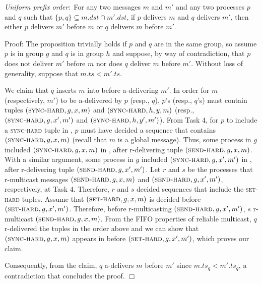 \begin{proposition}
\textit{Uniform prefix order}:~For any two messages $m$ and $m'$ and any two processes $p$ and $q$ such that $\lbrace p, q\rbrace \subseteq m.\mathit{dst} \cap m'.\mathit{dst}$, if $p$ delivers $m$ and $q$ delivers $m'$, then either $p$ delivers $m'$ before $m$ or $q$ delivers $m$ before $m'$.
\end{proposition}
\noindent
{\sc Proof:} 
The proposition trivially holds if $p$ and $q$ are in the same group, so assume $p$ is in group $g$ and $q$ is in group $h$ and suppose, by way of contradiction, that $p$ does not deliver $m'$ before $m$ nor does $q$ deliver $m$ before $m'$. 
Without loss of generality, suppose that $m.ts < m'.ts$. 

We claim that $q$ inserts $m$ into \Buffer before a-delivering $m'$. 
In order for $m$ (respectively, $m'$) to be a-delivered by $p$ (resp., $q$), $p$'s (resp., $q$'s) \Buffer must contain tuples $(\textsc{sync-hard}, g, x, m)$ and $(\textsc{sync-hard}, h, y, m)$ (resp., $(\textsc{sync-hard}, g, x', m')$ and $(\textsc{sync-hard}, h, y', m')$).
From Task 4, for $p$ to include a \textsc{sync-hard} tuple in \Buffer, $p$ must have decided a sequence that contains $(\textsc{sync-hard}, g, x, m)$ (recall that $m$ is a global message).
Thus, some process in $g$ included $(\textsc{sync-hard}, g, x, m)$ in \Pend, after r-delivering tuple  $(\textsc{send-hard}, g, x, m)$.
With a similar argument, some process in $g$ included $(\textsc{sync-hard}, g, x', m')$ in \Pend, after r-delivering tuple $(\textsc{send-hard}, g, x', m')$.
Let $r$ and $s$ be the processes that r-multicast messages $(\textsc{send-hard}, g, x, m)$ and $(\textsc{send-hard}, g, x', m')$, respectively, at Task 4.
Therefore, $r$ and $s$ decided sequences that include the \textsc{set-hard} tuples.
Assume that $(\textsc{set-hard}, g, x, m)$ is decided before $(\textsc{set-hard}, g, x', m')$.
Therefore, before r-multicasting $(\textsc{send-hard}, g, x', m')$, $s$ r-multicast $(\textsc{send-hard}, g, x, m)$.
From the FIFO properties of reliable multicast, $q$ r-delivered the tuples in the order above and we can show that $(\textsc{sync-hard}, g, x, m)$ appears in \Buffer before $(\textsc{set-hard}, g, x', m')$, which proves our claim.

Consequently, from the claim, $q$ a-delivers $m$ before $m'$ since $m.ts_q < m'.ts_q$, a contradiction that concludes the proof.
\hfill$\Box$

